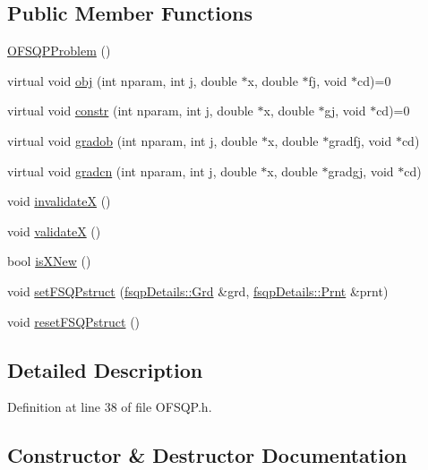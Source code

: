 \subsection*{Public Member Functions}
\begin{DoxyCompactItemize}
\item 
\hyperlink{classocra_1_1OFSQPProblem_affaeb6cbf6326ef2e9dab6b7ee8c80f6}{O\+F\+S\+Q\+P\+Problem} ()
\item 
virtual void \hyperlink{classocra_1_1OFSQPProblem_adca0c224eb1b9f6e0c2d17f07277a899}{obj} (int nparam, int j, double $\ast$x, double $\ast$fj, void $\ast$cd)=0
\item 
virtual void \hyperlink{classocra_1_1OFSQPProblem_a2049a97008ac6eaa306c3cb05ef7d394}{constr} (int nparam, int j, double $\ast$x, double $\ast$gj, void $\ast$cd)=0
\item 
virtual void \hyperlink{classocra_1_1OFSQPProblem_a1300d237d9b87df1f71db7129c38458a}{gradob} (int nparam, int j, double $\ast$x, double $\ast$gradfj, void $\ast$cd)
\item 
virtual void \hyperlink{classocra_1_1OFSQPProblem_ab89eefbaf9b86a89a0ceede0b4b61284}{gradcn} (int nparam, int j, double $\ast$x, double $\ast$gradgj, void $\ast$cd)
\item 
void \hyperlink{classocra_1_1OFSQPProblem_a65096824ee00c0254cfeee877dba0141}{invalidateX} ()
\item 
void \hyperlink{classocra_1_1OFSQPProblem_a4877a5ab95e85c32c32eca22d2db1147}{validateX} ()
\item 
bool \hyperlink{classocra_1_1OFSQPProblem_a3c43fbd5d2ef3aeb9c6d936c83d34464}{is\+X\+New} ()
\item 
void \hyperlink{classocra_1_1OFSQPProblem_ae57b5fa2934e2ae619e748079335d3b7}{set\+F\+S\+Q\+Pstruct} (\hyperlink{structocra_1_1fsqpDetails_1_1Grd}{fsqp\+Details\+::\+Grd} \&grd, \hyperlink{structocra_1_1fsqpDetails_1_1Prnt}{fsqp\+Details\+::\+Prnt} \&prnt)
\item 
void \hyperlink{classocra_1_1OFSQPProblem_a774f1a1e9d5014ea878b8de4750c3a13}{reset\+F\+S\+Q\+Pstruct} ()
\end{DoxyCompactItemize}


\subsection{Detailed Description}


Definition at line 38 of file O\+F\+S\+Q\+P.\+h.



\subsection{Constructor \& Destructor Documentation}
\hypertarget{classocra_1_1OFSQPProblem_affaeb6cbf6326ef2e9dab6b7ee8c80f6}{}\label{classocra_1_1OFSQPProblem_affaeb6cbf6326ef2e9dab6b7ee8c80f6} 

